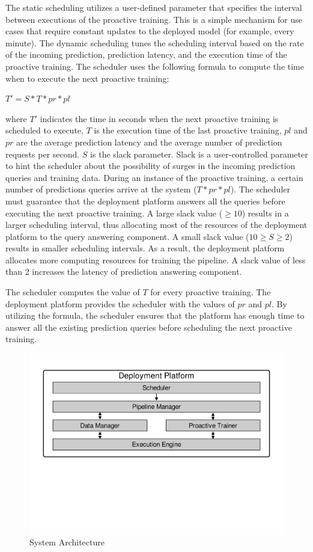 The static scheduling utilizes a user-defined parameter that specifies the interval between executions of the proactive training.
This is a simple mechanism for use cases that require constant updates to the deployed model (for example, every minute).
The dynamic scheduling tunes the scheduling interval based on the rate of the incoming prediction, prediction latency, and the execution time of the proactive training.
The scheduler uses the following formula to compute the time when to execute the next proactive training:
\begin{center}
$T' = S * T * pr * pl$
\end{center}
where $T'$ indicates the time in seconds when the next proactive training is scheduled to execute, $T$ is the execution time of the last proactive training, $pl$ and $pr$ are the average prediction latency and the average number of prediction requests per second.
$S$ is the slack parameter.
Slack is a user-controlled parameter to hint the scheduler about the possibility of surges in the incoming prediction queries and training data.
During an instance of the proactive training, a certain number of predictions queries arrive at the system ($T * pr * pl$).
The scheduler must guarantee that the deployment platform answers all the queries before executing the next proactive training.
A large slack value ($\geq10$) results in a larger scheduling interval, thus allocating most of the resources of the deployment platform to the query answering component.
A small slack value ($10 \geq S \geq 2$) results in smaller scheduling intervals.
As a result, the deployment platform allocates more computing resources for training the pipeline.
A slack value of less than 2 increases the latency of prediction answering component.

The scheduler computes the value of $T$ for every proactive training.
The deployment platform provides the scheduler with the values of $pr$ and $pl$. 
By utilizing the formula, the scheduler ensures that the platform has enough time to answer all the existing prediction queries before scheduling the next proactive training.
\begin{figure}[h]
\centering
\includegraphics[width=\columnwidth]{../images/system-architecture.pdf}
\caption{System Architecture}
\label{fig:system-architecture}
\end{figure}


